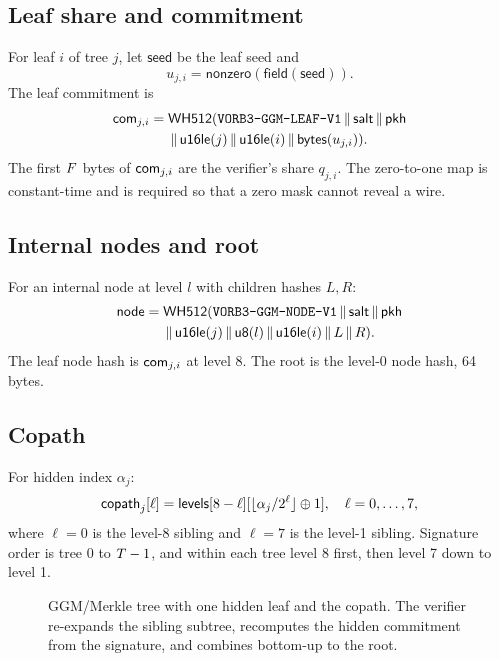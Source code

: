 \documentclass[11pt,a4paper]{article}
\begin{document}
\subsection{Leaf share and commitment}

For leaf $i$ of tree $j$, let $\mathsf{seed}$ be the leaf seed and
\[
u_{j,i}=\mathsf{nonzero}(\mathsf{field}(\mathsf{seed})).
\]
The leaf commitment is
\begin{align*}
\mathsf{com}_{j,i}={}&
\mathsf{WH512}(\texttt{VORB3-GGM-LEAF-V1}\,\|\,\mathsf{salt}\,\|\,\mathsf{pkh}\\
&\,\|\,\mathsf{u16le}(j)\,\|\,\mathsf{u16le}(i)
\,\|\,\mathsf{bytes}(u_{j,i})).
\end{align*}
The first $F$ bytes of $\mathsf{com}_{j,i}$ are the verifier's share $q_{j,i}$.
The zero-to-one map is constant-time and is required so that a zero mask
cannot reveal a wire.

\subsection{Internal nodes and root}

For an internal node at level $l$ with children hashes $L,R$:
\begin{align*}
\mathsf{node}={}&
\mathsf{WH512}(\texttt{VORB3-GGM-NODE-V1}\,\|\,\mathsf{salt}\,\|\,\mathsf{pkh}\\
&\,\|\,\mathsf{u16le}(j)\,\|\,\mathsf{u8}(l)\,\|\,\mathsf{u16le}(i)
\,\|\, L\,\|\, R).
\end{align*}
The leaf node hash is $\mathsf{com}_{j,i}$ at level 8. The root is the level-0 node
hash, 64 bytes.

\subsection{Copath}

For hidden index $\alpha_j$:
\[
\mathsf{copath}_j[\ell]=
\mathsf{levels}[8-\ell][\lfloor\alpha_j/2^\ell\rfloor\oplus1],
\quad \ell=0,\ldots,7,
\]
where $\ell=0$ is the level-8 sibling and $\ell=7$ is the level-1 sibling.
Signature order is tree 0 to $T-1$, and within each tree level 8 first,
then level 7 down to level 1.

\begin{figure}[ht]
\centering
{}
\caption{GGM/Merkle tree with one hidden leaf and the copath. The verifier
re-expands the sibling subtree, recomputes the hidden commitment from the
signature, and combines bottom-up to the root.}
\label{fig:ggm}
\end{figure}
\end{document}
